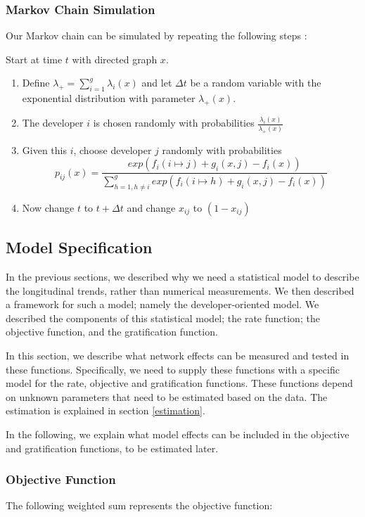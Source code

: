 \documentclass[11pt]{report}
\begin{document}
\subsubsection{Markov Chain Simulation}
\label{MarkovChainSimulationSteps}
Our Markov chain can be simulated by repeating the following steps \cite{Snijders2004}:

Start at time $t$ with directed graph $x$. 
\begin{enumerate}
\item Define $\lambda_{+} = \sum_{i=1}^g \lambda_i(x)$ and let $\Delta t$ be a random variable with the exponential distribution with parameter $\lambda_{+}(x)$.
\item The developer $i$ is chosen randomly with probabilities $\frac{\lambda_{i}(x)}{\lambda_{+}(x)}$
\item Given this $i$, choose developer $j$ randomly with probabilities 
\begin{equation}
p_{ij}(x) = \frac{exp(f_i(i \mapsto j) + g_i(x, j) - f_i(x))}{\sum_{h=1, h \neq i}^{g} exp(f_i(i \mapsto h) + g_i(x, j) - f_i(x))} \nonumber
\end{equation}
\item Now change $t$ to $t + \Delta t$ and change $x_{ij}$ to $(1 - x_{ij})$
\end{enumerate}

\subsection{Model Specification}
In the previous sections, we described why we need a statistical model to describe the longitudinal trends, rather than numerical measurements. We then described a framework for such a model; namely the developer-oriented model. We described the components of this statistical model; the rate function; the objective function, and the gratification function.

In this section, we describe what network effects can be measured and tested in these functions. Specifically, we need to supply these functions with a specific model for the rate, objective and gratification functions. These functions depend on unknown parameters that need to be estimated based on the data. The estimation is explained in section \ref{estimation}. 

In the following, we explain what model effects can be included in the objective and gratification functions, to be estimated later.

\subsubsection{Objective Function}
The following weighted sum represents the objective function:
\end{document}
